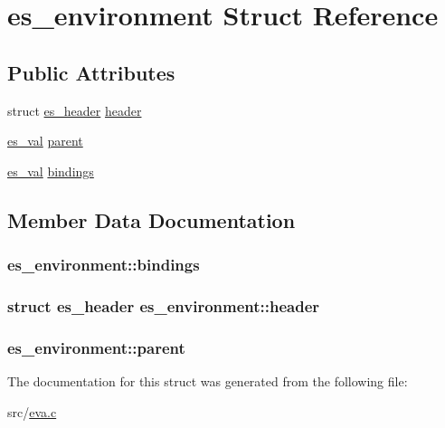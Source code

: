 \hypertarget{structes__environment}{\section{es\-\_\-environment Struct Reference}
\label{structes__environment}
}
\subsection*{Public Attributes}
\begin{DoxyCompactItemize}
\item 
struct \hyperlink{structes__header}{es\-\_\-header} \hyperlink{structes__environment_af4ae6b3491c544d269d81edf745f04a4}{header}
\item 
\hyperlink{eva_8h_a8333c63b2093a13aab6d419c87680d7f}{es\-\_\-val} \hyperlink{structes__environment_ada8e1df2de373e2c2ddfc281180be5d8}{parent}
\item 
\hyperlink{eva_8h_a8333c63b2093a13aab6d419c87680d7f}{es\-\_\-val} \hyperlink{structes__environment_afe43ed9b5b0651cb339d932f7d8e045d}{bindings}
\end{DoxyCompactItemize}


\subsection{Member Data Documentation}
\hypertarget{structes__environment_afe43ed9b5b0651cb339d932f7d8e045d}{
\subsubsection[{bindings}]{ es\-\_\-environment\-::bindings}}\label{structes__environment_afe43ed9b5b0651cb339d932f7d8e045d}
\hypertarget{structes__environment_af4ae6b3491c544d269d81edf745f04a4}{
\subsubsection[{header}]{\setlength{\rightskip}{0pt plus 5cm}struct {\bf es\-\_\-header} es\-\_\-environment\-::header}}\label{structes__environment_af4ae6b3491c544d269d81edf745f04a4}
\hypertarget{structes__environment_ada8e1df2de373e2c2ddfc281180be5d8}{
\subsubsection[{parent}]{ es\-\_\-environment\-::parent}}\label{structes__environment_ada8e1df2de373e2c2ddfc281180be5d8}


The documentation for this struct was generated from the following file\-:\begin{DoxyCompactItemize}
\item 
src/\hyperlink{eva_8c}{eva.\-c}\end{DoxyCompactItemize}

